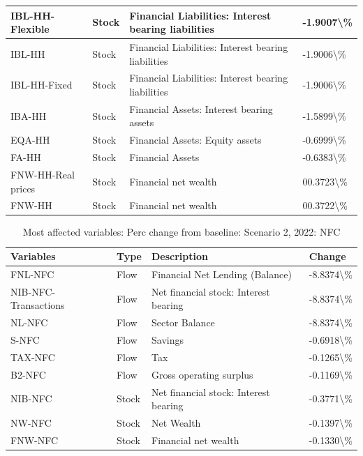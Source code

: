 \documentclass[
]{book}
\begin{document}
\begin{table}
\begin{tabular}[t]{l|l|l|l}
\hline
IBL-HH-Flexible & Stock & Financial Liabilities: Interest bearing liabilities & -1.9007\textbackslash{}\%\\
\hline
IBL-HH & Stock & Financial Liabilities: Interest bearing liabilities & -1.9006\textbackslash{}\%\\
\hline
IBL-HH-Fixed & Stock & Financial Liabilities: Interest bearing liabilities & -1.9006\textbackslash{}\%\\
\hline
IBA-HH & Stock & Financial Assets: Interest bearing assets & -1.5899\textbackslash{}\%\\
\hline
EQA-HH & Stock & Financial Assets: Equity assets & -0.6999\textbackslash{}\%\\
\hline
FA-HH & Stock & Financial Assets & -0.6383\textbackslash{}\%\\
\hline
FNW-HH-Real prices & Stock & Financial net wealth & 00.3723\textbackslash{}\%\\
\hline
FNW-HH & Stock & Financial net wealth & 00.3722\textbackslash{}\%\\
\hline
\end{tabular}
\end{table}

\begin{table}

\caption{\label{tab:most-affected-scenario-2-perc-NFC}Most affected variables: Perc change from baseline: Scenario 2, 2022: NFC}
\centering
\fontsize{10}{12}\selectfont
\begin{tabular}[t]{l|l|l|l}
\hline
Variables & Type & Description & Change\\
\hline
FNL-NFC & Flow & Financial Net Lending (Balance) & -8.8374\textbackslash{}\%\\
\hline
NIB-NFC-Transactions & Flow & Net financial stock: Interest bearing & -8.8374\textbackslash{}\%\\
\hline
NL-NFC & Flow & Sector Balance & -8.8374\textbackslash{}\%\\
\hline
S-NFC & Flow & Savings & -0.6918\textbackslash{}\%\\
\hline
TAX-NFC & Flow & Tax & -0.1265\textbackslash{}\%\\
\hline
B2-NFC & Flow & Gross operating surplus & -0.1169\textbackslash{}\%\\
\hline
NIB-NFC & Stock & Net financial stock: Interest bearing & -0.3771\textbackslash{}\%\\
\hline
NW-NFC & Stock & Net Wealth & -0.1397\textbackslash{}\%\\
\hline
FNW-NFC & Stock & Financial net wealth & -0.1330\textbackslash{}\%\\
\hline
\end{tabular}
\end{table}
\end{document}
